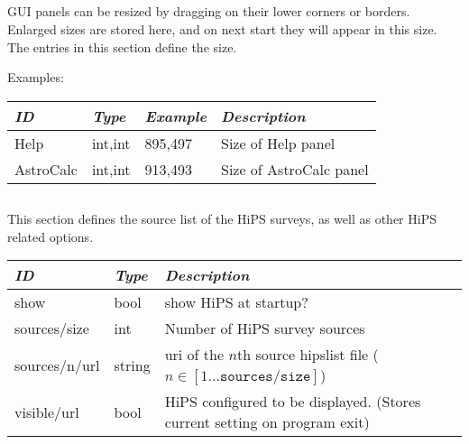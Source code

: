 
\subsection{}

GUI panels can be resized by dragging on their lower corners or borders.  
Enlarged sizes are stored here, and on next start they will appear in this size.
The entries in this section define the size.

Examples:

\noindent%
\begin{tabularx}{\textwidth}{l|l|l|X}
\toprule
\emph{ID}     & \emph{Type} & \emph{Example}&\emph{Description}      \\\midrule
Help          & int,int     &  895,497      & Size of Help panel     \\%
AstroCalc     & int,int     &  913,493      & Size of AstroCalc panel\\\bottomrule
\end{tabularx}


\subsection{}
\label{sec:config.ini:hips}

This section defines the source list of the HiPS surveys, as well as other
HiPS related options.

\noindent%
\begin{tabularx}{\textwidth}{l|l|X}\toprule
\emph{ID}     & \emph{Type} & \emph{Description}\\\midrule
show          & bool        & show HiPS at startup? \\
sources/size  & int         & Number of HiPS survey sources\\%
sources/n/url & string      & uri of the $n$th source hipslist file ($n \in [1 \ldots \mathtt{sources/size}]$)\\
visible/url   & bool        & HiPS configured to be displayed. (Stores current setting on program exit)\\\bottomrule
\end{tabularx}



